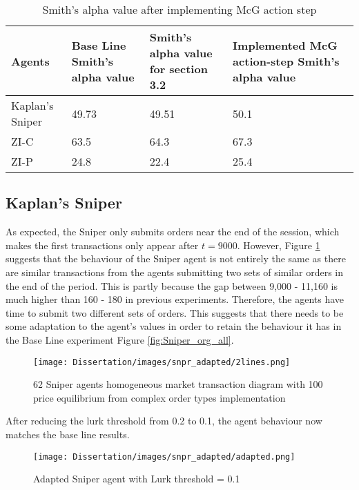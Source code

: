 \begin{table}[h]
\centering
\begin{tabular}{ |m||p{4cm}|p{4cm}|p{4cm}|} 
\hline
\textbf{Agents}& \textbf{Base Line Smith's alpha value} & \textbf{Smith's alpha value for section 3.2} & \textbf{Implemented McG action-step Smith's alpha value} \\
\hline
\hline
Kaplan's Sniper & 49.73  & 49.51 & 50.1 \\ 
\hline
ZI-C & 63.5 & 64.3 & 67.3\\ 
\hline
ZI-P & 24.8 & 22.4 & 25.4 \\ 
\hline
\end{tabular}
\caption{Smith's alpha value after implementing McG action step}  
\end{table}
\FloatBarrier

\subsection{Kaplan's Sniper}
As expected, the Sniper only submits orders near the end of the session, which makes the first transactions only appear after $t = 9000$. However, Figure \ref{fig:sniper_wrong} suggests that the behaviour of the Sniper agent is not entirely the same as there are similar transactions from the agents submitting two sets of similar orders in the end of the period. This is partly because the gap between 9,000 - 11,160 is much higher than 160 - 180 in previous experiments. Therefore, the agents have time to submit two different sets of orders. This suggests that there needs to be some adaptation to the agent's values in order to retain the behaviour it has in the Base Line experiment Figure \ref{fig:Sniper_org_all}. 

\begin{figure}[h]
\texttt{[image: Dissertation/images/snpr\_adapted/2lines.png]}
\caption{62 Sniper agents homogeneous market transaction diagram with 100 price equilibrium from complex order types implementation} 
\label{fig:sniper_wrong}
\end{figure} 
\FloatBarrier

After reducing the lurk threshold from 0.2 to 0.1, the agent behaviour now matches the base line results. 

\begin{figure}[h]
\texttt{[image: Dissertation/images/snpr\_adapted/adapted.png]}
\caption{Adapted Sniper agent with Lurk threshold = 0.1}
\label{fig:SNIPER_FINAL}
\end{figure} 
\FloatBarrier

